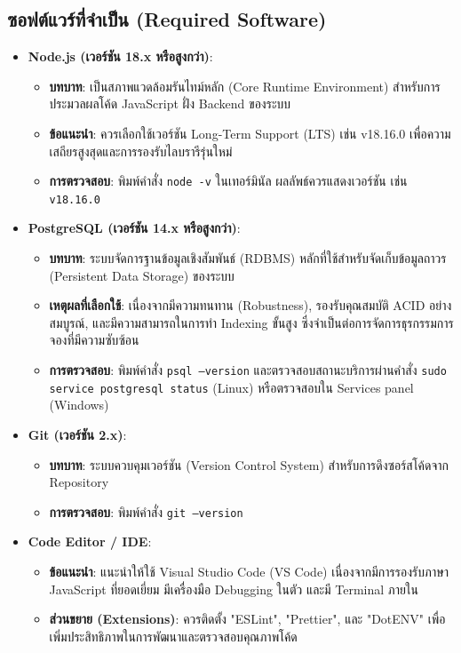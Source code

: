 \subsection{ซอฟต์แวร์ที่จำเป็น (Required Software)}
\begin{itemize}
    \item \textbf{Node.js (เวอร์ชัน 18.x หรือสูงกว่า)}: 
    \begin{itemize}
        \item \textbf{บทบาท}: เป็นสภาพแวดล้อมรันไทม์หลัก (Core Runtime Environment) สำหรับการประมวลผลโค้ด JavaScript ฝั่ง Backend ของระบบ
        \item \textbf{ข้อแนะนำ}: ควรเลือกใช้เวอร์ชัน Long-Term Support (LTS) เช่น v18.16.0 เพื่อความเสถียรสูงสุดและการรองรับไลบรารีรุ่นใหม่
        \item \textbf{การตรวจสอบ}: พิมพ์คำสั่ง \texttt{node -v} ในเทอร์มินัล ผลลัพธ์ควรแสดงเวอร์ชัน เช่น \texttt{v18.16.0}
    \end{itemize}
    
    \item \textbf{PostgreSQL (เวอร์ชัน 14.x หรือสูงกว่า)}:
    \begin{itemize}
        \item \textbf{บทบาท}: ระบบจัดการฐานข้อมูลเชิงสัมพันธ์ (RDBMS) หลักที่ใช้สำหรับจัดเก็บข้อมูลถาวร (Persistent Data Storage) ของระบบ
        \item \textbf{เหตุผลที่เลือกใช้}: เนื่องจากมีความทนทาน (Robustness), รองรับคุณสมบัติ ACID อย่างสมบูรณ์, และมีความสามารถในการทำ Indexing ขั้นสูง ซึ่งจำเป็นต่อการจัดการธุรกรรมการจองที่มีความซับซ้อน
        \item \textbf{การตรวจสอบ}: พิมพ์คำสั่ง \texttt{psql --version} และตรวจสอบสถานะบริการผ่านคำสั่ง \texttt{sudo service postgresql status} (Linux) หรือตรวจสอบใน Services panel (Windows)
    \end{itemize}
    
    \item \textbf{Git (เวอร์ชัน 2.x)}:
    \begin{itemize}
        \item \textbf{บทบาท}: ระบบควบคุมเวอร์ชัน (Version Control System) สำหรับการดึงซอร์สโค้ดจาก Repository
        \item \textbf{การตรวจสอบ}: พิมพ์คำสั่ง \texttt{git --version}
    \end{itemize}
    
    \item \textbf{Code Editor / IDE}:
    \begin{itemize}
        \item \textbf{ข้อแนะนำ}: แนะนำให้ใช้ Visual Studio Code (VS Code) เนื่องจากมีการรองรับภาษา JavaScript ที่ยอดเยี่ยม มีเครื่องมือ Debugging ในตัว และมี Terminal ภายใน
        \item \textbf{ส่วนขยาย (Extensions)}: ควรติดตั้ง "ESLint", "Prettier", และ "DotENV" เพื่อเพิ่มประสิทธิภาพในการพัฒนาและตรวจสอบคุณภาพโค้ด
    \end{itemize}
\end{itemize}

